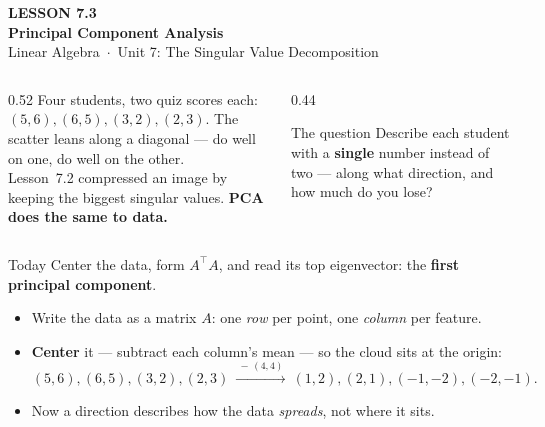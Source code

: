 \documentclass[aspectratio=169, 11pt]{beamer}
\newcommand{\T}{^{\top}}
\begin{document}
{
\begin{frame}[plain]
  \vspace{2.8cm}\hspace{0.55cm}%
  \begin{minipage}{0.9\textwidth}
    {\color{goldacc}\bfseries\small LESSON 7.3}\\[0.5cm]
    {\color{white}\bfseries\LARGE Principal Component Analysis}\\[1.0cm]
    {\color{blushmid}\small Linear Algebra~$\cdot$~Unit 7: The Singular Value Decomposition}
  \end{minipage}
\end{frame}
}

\begin{frame}[t, plain]
  \begin{columns}[T]
    \begin{column}{0.52\textwidth}
      Four students, two quiz scores each: $(5,6),(6,5),(3,2),(2,3)$. The scatter leans along a
      diagonal --- do well on one, do well on the other.\\[6pt]
      Lesson~7.2 compressed an image by keeping the biggest singular values. \textbf{PCA does the same to
      data.}
    \end{column}
    \begin{column}{0.44\textwidth}
      \begin{block}{The question}
        Describe each student with a \textbf{single} number instead of two --- along what direction, and how
        much do you lose?
      \end{block}
    \end{column}
  \end{columns}
  \vspace{2pt}
  \begin{block}{Today}
    Center the data, form $A\T A$, and read its top eigenvector: the \textbf{first principal component}.
  \end{block}
\end{frame}

\begin{frame}[t, plain]
  \begin{itemize}
    \setlength{\itemsep}{6pt}
    \item Write the data as a matrix $A$: one \emph{row} per point, one \emph{column} per feature.
    \item \textbf{Center} it --- subtract each column's mean --- so the cloud sits at the origin:
          \[ (5,6),(6,5),(3,2),(2,3)\ \xrightarrow{\ -\,(4,4)\ }\ (1,2),(2,1),(-1,-2),(-2,-1). \]
    \item Now a direction describes how the data \emph{spreads}, not where it sits.
  \end{itemize}
\end{frame}
\end{document}
